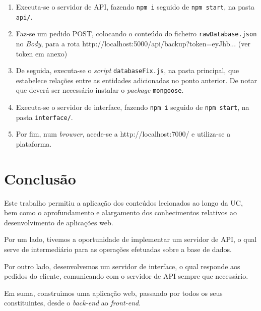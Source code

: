 \documentclass[a4paper]{report}
\begin{document}
	\begin{enumerate}
		\item Executa-se o servidor de API, fazendo \texttt{npm i} seguido de \texttt{npm start}, na pasta \texttt{api/}.
        
        \item Faz-se um pedido POST, colocando o conteúdo do ficheiro \texttt{rawDatabase.json} no \textit{Body}, para a rota http://localhost:5000/api/backup?token=eyJhb... (ver token em anexo)
        
        \item De seguida, executa-se o \textit{script} \texttt{databaseFix.js}, na pasta principal, que estabelece relações entre as entidades adicionadas no ponto anterior.
              De notar que deverá ser necessário instalar o \textit{package} \texttt{mongoose}.
		
		\item Executa-se o servidor de interface, fazendo \texttt{npm i} seguido de \texttt{npm start}, na pasta \texttt{interface/}.

        \item Por fim, num \textit{browser}, acede-se a http://localhost:7000/ e utiliza-se a plataforma.
	\end{enumerate}

\chapter{Conclusão}
Este trabalho permitiu a aplicação dos conteúdos lecionados ao longo da UC, bem como o aprofundamento e alargamento dos conhecimentos relativos ao desenvolvimento de aplicações web.

Por um lado, tivemos a oportunidade de implementar um servidor de API, o qual serve de intermediário para as operações efetuadas sobre a base de dados.

Por outro lado, desenvolvemos um servidor de interface, o qual responde aos pedidos do cliente, comunicando com o servidor de API sempre que necessário.

Em suma, construimos uma aplicação web, passando por todos os seus constituintes, desde o \textit{back-end} ao \textit{front-end}.
\end{document}
